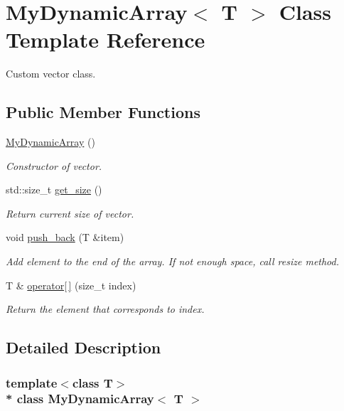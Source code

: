 \hypertarget{classMyDynamicArray}{}\section{My\+Dynamic\+Array$<$ T $>$ Class Template Reference}
\label{classMyDynamicArray}


Custom vector class.  


\subsection*{Public Member Functions}
\begin{DoxyCompactItemize}
\item 
\hyperlink{classMyDynamicArray_a2ef74e00f7c68bdcfcb18c8b35f86aee}{My\+Dynamic\+Array} ()
\begin{DoxyCompactList}\small\item\em Constructor of vector. \end{DoxyCompactList}\item 
std\+::size\+\_\+t \hyperlink{classMyDynamicArray_a98b30354ee7c4a9a01f5b7f2778d2463}{get\+\_\+size} ()
\begin{DoxyCompactList}\small\item\em Return current size of vector. \end{DoxyCompactList}\item 
void \hyperlink{classMyDynamicArray_a1aeb5ca50213cc05cd746d02968c8afb}{push\+\_\+back} (T \&item)
\begin{DoxyCompactList}\small\item\em Add element to the end of the array. If not enough space, call resize method. \end{DoxyCompactList}\item 
T \& \hyperlink{classMyDynamicArray_a0626d6960ce1febf56a5a36087ddb8d2}{operator\mbox{[}$\,$\mbox{]}} (size\+\_\+t index)
\begin{DoxyCompactList}\small\item\em Return the element that corresponds to index. \end{DoxyCompactList}\end{DoxyCompactItemize}


\subsection{Detailed Description}
\subsubsection*{template$<$class T$>$\\*
class My\+Dynamic\+Array$<$ T $>$}

